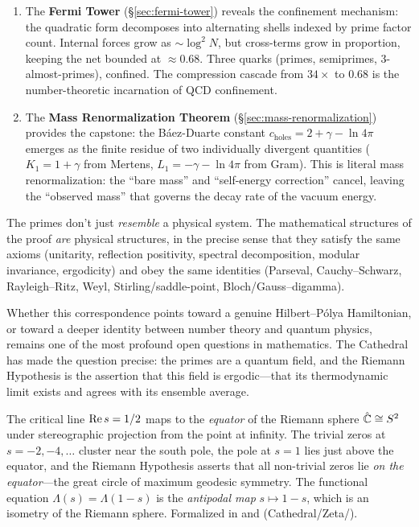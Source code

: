 \documentclass[11pt,a4paper]{article}
\begin{document}
\begin{enumerate}
  \item The \textbf{Fermi Tower} (\S\ref{sec:fermi-tower}) reveals the
    confinement mechanism: the quadratic form decomposes into alternating
    shells indexed by prime factor count. Internal forces grow as
    $\sim\!\log^2 N$, but cross-terms grow in proportion, keeping the
    net bounded at $\approx\! 0.68$. Three quarks (primes, semiprimes,
    3-almost-primes), confined. The compression cascade from $34\times$
    to $0.68$ is the number-theoretic incarnation of QCD confinement.

  \item The \textbf{Mass Renormalization Theorem}
    (\S\ref{sec:mass-renormalization}) provides the capstone:
    the B\'aez-Duarte constant $c_{\mathrm{holes}} = 2 + \gamma - \ln 4\pi$
    emerges as the finite residue of two individually divergent quantities
    ($K_1 = 1 + \gamma$ from Mertens, $L_1 = -\gamma - \ln 4\pi$ from Gram).
    This is literal mass renormalization: the ``bare mass'' and
    ``self-energy correction'' cancel, leaving the ``observed mass''
    that governs the decay rate of the vacuum energy.
\end{enumerate}

The primes don't just \emph{resemble} a physical system. The
mathematical structures of the proof \emph{are} physical structures,
in the precise sense that they satisfy the same axioms (unitarity,
reflection positivity, spectral decomposition, modular invariance,
ergodicity)
and obey the same identities (Parseval, Cauchy--Schwarz, Rayleigh--Ritz,
Weyl, Stirling/saddle-point, Bloch/Gauss--digamma).

Whether this correspondence points toward a genuine Hilbert--P\'olya
Hamiltonian, or toward a deeper identity between number theory and
quantum physics, remains one of the most profound open questions in
mathematics. The Cathedral has made the question precise: the primes
are a quantum field, and the Riemann Hypothesis is the assertion that
this field is ergodic---that its thermodynamic limit exists and
agrees with its ensemble average.

\begin{remark}
The critical line $\operatorname{Re} s = 1/2$ maps to the \emph{equator} of the
Riemann sphere $\hat{\mathbb{C}} \cong S^2$ under stereographic projection
from the point at infinity. The trivial zeros at $s = -2, -4, \ldots$
cluster near the south pole, the pole at $s = 1$ lies just above the
equator, and the Riemann Hypothesis asserts that all non-trivial zeros
lie \emph{on the equator}---the great circle of maximum geodesic
symmetry. The functional equation $\Lambda(s) = \Lambda(1-s)$ is the
\emph{antipodal map} $s \mapsto 1 - s$, which is an isometry of the
Riemann sphere. Formalized in  and
 (Cathedral/Zeta/).
\end{remark}
\end{document}
